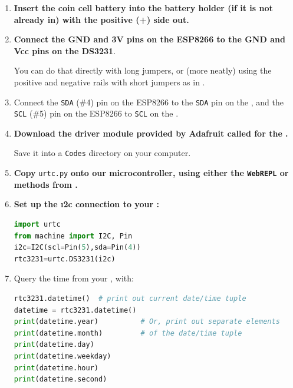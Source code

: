 \begin{enumerate}
	\item \textbf{Insert the coin cell battery into the battery holder (if it is not already in) with the positive (+) side out.}
	\item \textbf{Connect the GND and 3V pins on the ESP8266 to the GND and Vcc pins on the DS3231}. 
	
	You can do that directly with long jumpers, or (more neatly) using the positive and negative rails with short jumpers as in .
	\item Connect the \texttt{SDA} (\#4) pin on the ESP8266 to the \texttt{SDA} pin on the , and the  \texttt{SCL} (\#5) pin on the ESP8266 to \texttt{SCL} on the .
	\item \textbf{Download the driver module provided by Adafruit called  for the  \rtc.}
	
	Save it into a \texttt{Codes} directory on your computer.
	
	\item \textbf{Copy } \lstinline{urtc.py} \textbf{onto our microcontroller, using either the \texttt{WebREPL} or \mpfshell methods from .}  
	\item %
	\textbf{Set up the \i2c connection to your :}
\begin{lstlisting}[language=Python]
import urtc
from machine import I2C, Pin
i2c=I2C(scl=Pin(5),sda=Pin(4))
rtc3231=urtc.DS3231(i2c)
\end{lstlisting}
	\item Query the time from your , with:
\begin{lstlisting}[language=Python]
rtc3231.datetime()  # print out current date/time tuple
datetime = rtc3231.datetime() 
print(datetime.year)          # Or, print out separate elements
print(datetime.month)         # of the date/time tuple
print(datetime.day)
print(datetime.weekday)
print(datetime.hour)
print(datetime.second)
\end{lstlisting}
\end{enumerate}

